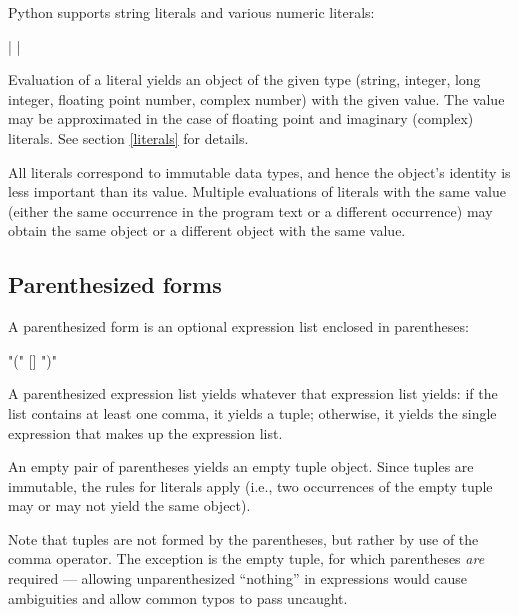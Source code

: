 Python supports string literals and various numeric literals:

\begin{productionlist}
             { |  | }
\end{productionlist}

Evaluation of a literal yields an object of the given type (string,
integer, long integer, floating point number, complex number) with the
given value.  The value may be approximated in the case of floating
point and imaginary (complex) literals.  See section \ref{literals}
for details.

All literals correspond to immutable data types, and hence the
object's identity is less important than its value.  Multiple
evaluations of literals with the same value (either the same
occurrence in the program text or a different occurrence) may obtain
the same object or a different object with the same value.


\subsection{Parenthesized forms\label{parenthesized}}

A parenthesized form is an optional expression list enclosed in
parentheses:

\begin{productionlist}
             {"(" [] ")"}
\end{productionlist}

A parenthesized expression list yields whatever that expression list
yields: if the list contains at least one comma, it yields a tuple;
otherwise, it yields the single expression that makes up the
expression list.

An empty pair of parentheses yields an empty tuple object.  Since
tuples are immutable, the rules for literals apply (i.e., two
occurrences of the empty tuple may or may not yield the same object).

Note that tuples are not formed by the parentheses, but rather by use
of the comma operator.  The exception is the empty tuple, for which
parentheses \emph{are} required --- allowing unparenthesized ``nothing''
in expressions would cause ambiguities and allow common typos to
pass uncaught.


